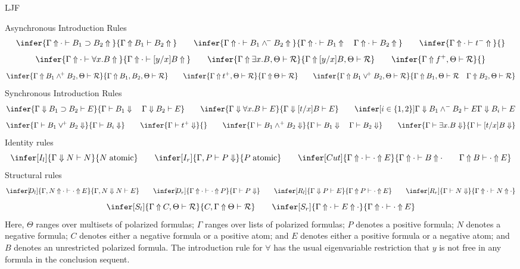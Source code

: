 \begin{entry}{LJF}
\begin{calculus}
{\sc Asynchronous Introduction Rules}
\[
  \infer{\jUnfG{\cdot}{B_1 \supset B_2}}{\jUnfG{B_1}{B_2}} %
  \qquad
  \infer{\jUnfG{\cdot}{B_1 \wedgen B_2}} %
                   {\jUnfG{\cdot}{B_1} \quad \jUnfG{\cdot}{B_2}}
  \qquad
  \infer{\jUnfG{\cdot}{\truen}}{} %
\]
\[
  \infer{\jUnfG{\cdot}{\forall x.B}}{\jUnfG{\cdot}{[y/x]B}} %
  \qquad
  \infer{\jUnfGamb{\exists x.B, \Theta}}{\jUnfGamb{[y/x]B,\Theta}} %
  \qquad
  \infer{\jUnfGamb{\falsep, \Theta}}{} %
\]
\[
  \infer{\jUnfGamb{B_1\wedgep B_2,\Theta}}{\jUnfGamb{B_1,B_2,\Theta}} %
  \qquad
  \infer{\jUnfGamb{\truep, \Theta}}{\jUnfGamb{\Theta}} %
  \qquad
  \infer{\jUnfGamb{B_1\veep B_2,\Theta}} %
                 {\jUnfGamb{B_1,\Theta}\quad \jUnfGamb{B_2,\Theta}}
\]
{\sc Synchronous Introduction Rules}
\[ 
  \infer{\jLfG{B_1 \supset B_2}}{\jRfG{B_1}\quad \jLfG{B_2}} %
  \qquad
  \infer{\jLfG{\forall x.B}}{\jLfG{[t/x]B}} %
  \qquad
  \infer[i \in \{1,2\}]{\jLfG {B_1 \wedge^- B_2}}{\jLfG{B_i}} %
\]
\[
  \infer{\jRfG{B_1 \veep B_2}}{\jRfG{B_i}} %
  \qquad
  \infer{\jRfG{\truep}}{} %
  \qquad
  \infer{\jRfG{B_1 \wedge^+ B_2}}{\jRfG{B_1}\quad\jRfG{B_2}} %
  \qquad
  \infer{\jRfG{\exists x.B}}{\jRfG{[t/x]B}} %
\]
{\sc Identity rules}
\[
  \infer[I_l]{\jLf{\Gamma}{N}{N}}{N \; \mbox{atomic}}
  \qquad
  \infer[I_r]{\jRf{\Gamma,P}{P}}{P \; \mbox{atomic}}
  \qquad
  \infer[Cut]{\jUnf{\Gamma}{\cdot}{\cdot}{E}}
             {\jUnf{\Gamma}{\cdot}{B}{\cdot}\qquad \jUnf{\Gamma}{B}{\cdot}{E}}
\]
{\sc Structural rules}
\[
  \infer[\kern -2pt D_l]{\jUnf{\Gamma,N}{\cdot}{\cdot}{E}}{\jLf{\Gamma,N}{N}{E}}
  \qquad
  \infer[\kern -2 pt D_r]{\jUnf{\Gamma}{\cdot}{\cdot}{P}}{\jRf{\Gamma}{P}}
  \qquad
  \infer[R_l]{\jLf{\Gamma}{P}{E}}{\jUnf{\Gamma}{P}{\cdot}{E}}
  \qquad
  \infer[R_r]{\jRf{\Gamma}{N}}{ \jUnf{\Gamma}{\cdot}{N}{\cdot}}
\]
\[
  \infer[S_l]{\jUnfamb{\Gamma}{C,\Theta}{\null}}{\jUnfamb{C,\Gamma}{\Theta}{\null}}
  \qquad
  \infer[S_r]{\jUnf{\Gamma}{\cdot}{E}{\cdot}}{\jUnf{\Gamma}{\cdot}{\cdot}{E}}
\]
Here,
$\Theta$ ranges over multisets of polarized formulas;
$\Gamma$ ranges over lists of polarized formulas;
$P$ denotes a positive formula;
$N$ denotes a negative formula;
$C$ denotes either a negative formula or a positive atom; and
$E$ denotes either a positive formula or a negative atom; and
$B$ denotes an unrestricted polarized formula.
The introduction rule for $\forall$ has the usual eigenvariable
restriction that $y$ is not free in any formula in the conclusion
sequent. 
\end{calculus}


\end{entry}
